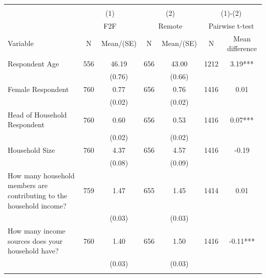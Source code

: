 
\begin{tabular}{@{\extracolsep{5pt}}lcccccc}
\\[-1.8ex]\hline \hline \\[-1.8ex]
 & \multicolumn{2}{c}{(1)}  & \multicolumn{2}{c}{(2)}  & \multicolumn{2}{c}{(1)-(2)} \\
 & \multicolumn{2}{c}{F2F}  & \multicolumn{2}{c}{Remote}  & \multicolumn{2}{c}{Pairwise t-test}  \\
Variable & N & Mean/(SE) & N & Mean/(SE) & N & Mean difference \\ \hline \\[-1.8ex] 
Respondent Age   & 556    & 46.19    & 656    & 43.00    & 1212    & 3.19***   \\
 &   & (0.76)  &   & (0.66)  &   &  \\ [1ex]
Female Respondent   & 760    & 0.77    & 656    & 0.76    & 1416    & 0.01   \\
 &   & (0.02)  &   & (0.02)  &   &  \\ [1ex]
Head of Household Respondent   & 760    & 0.60    & 656    & 0.53    & 1416    & 0.07***   \\
 &   & (0.02)  &   & (0.02)  &   &  \\ [1ex]
Household Size   & 760    & 4.37    & 656    & 4.57    & 1416    & -0.19   \\
 &   & (0.08)  &   & (0.09)  &   &  \\ [1ex]
How many household members are contributing to the household income?   & 759    & 1.47    & 655    & 1.45    & 1414    & 0.01   \\
 &   & (0.03)  &   & (0.03)  &   &  \\ [1ex]
How many income sources does your household have?   & 760    & 1.40    & 656    & 1.50    & 1416    & -0.11***   \\
 &   & (0.03)  &   & (0.03)  &   &  \\ [1ex]
\hline \hline \\[-1.8ex]

\end{tabular}
